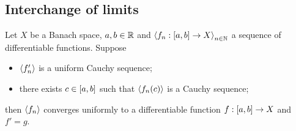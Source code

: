 \subsection{Interchange of limits}

\begin{proposition} \label{derivativeOfUniformLimit}
Let $X$ be a Banach space, $a,b\in \mathbb{R}$ and $\seq{f_n: \interval{a,b} \to X}_{n\in\N}$ a sequence of differentiable functions. Suppose
\begin{itemize}
\item $\left\langle f_n' \right\rangle$ is a uniform Cauchy sequence;
\item there exists $c\in \interval{a,b}$ such that $\left\langle f_n(c) \right\rangle$ is a Cauchy sequence;
\end{itemize}
then $\left\langle f_n \right\rangle$ converges uniformly to a differentiable function $f: \interval{a,b}\to X$ and $f' = g$.
\end{proposition}
